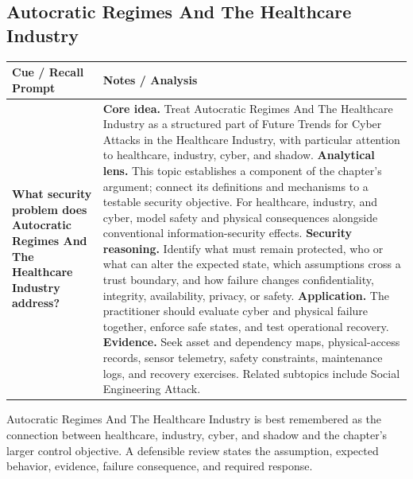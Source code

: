 \documentclass[11pt]{article}
\newcommand{\CornellHeader}{%
\rowcolor{Navy}\color{white}\bfseries Cue / Recall Prompt & \color{white}\bfseries Notes / Analysis\\\hline}
\newcommand{\CornellRow}[2]{%
\cellcolor{CueGray}\RaggedRight\textbf{#1} & \RaggedRight #2\\\hline}
\begin{document}
\subsection*{Autocratic Regimes And The Healthcare Industry}
\begin{longtable}{>{\RaggedRight\arraybackslash}p{}|>{\RaggedRight\arraybackslash}p{}}
\CornellHeader
\CornellRow{What security problem does Autocratic Regimes And The Healthcare Industry address?}{\textbf{Core idea.} Treat Autocratic Regimes And The Healthcare Industry as a structured part of Future Trends for Cyber Attacks in the Healthcare Industry, with particular attention to healthcare, industry, cyber, and shadow. \textbf{Analytical lens.} This topic establishes a component of the chapter's argument; connect its definitions and mechanisms to a testable security objective. For healthcare, industry, and cyber, model safety and physical consequences alongside conventional information-security effects. \textbf{Security reasoning.} Identify what must remain protected, who or what can alter the expected state, which assumptions cross a trust boundary, and how failure changes confidentiality, integrity, availability, privacy, or safety. \textbf{Application.} The practitioner should evaluate cyber and physical failure together, enforce safe states, and test operational recovery. \textbf{Evidence.} Seek asset and dependency maps, physical-access records, sensor telemetry, safety constraints, maintenance logs, and recovery exercises. Related subtopics include Social Engineering Attack.}
\end{longtable}
\begin{topicsummary}
Autocratic Regimes And The Healthcare Industry is best remembered as the connection between healthcare, industry, cyber, and shadow and the chapter's larger control objective. A defensible review states the assumption, expected behavior, evidence, failure consequence, and required response.
\end{topicsummary}
\end{document}
